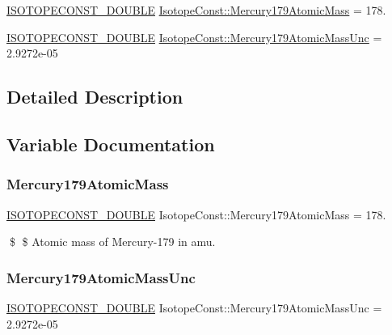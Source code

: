 \begin{DoxyCompactItemize}
\item 
\mbox{\hyperlink{group___isotope_const-_macros_ga8f45a7272ce02c0b4c65c44636ed719a}{I\+S\+O\+T\+O\+P\+E\+C\+O\+N\+S\+T\+\_\+\+D\+O\+U\+B\+LE}} \mbox{\hyperlink{group___isotope_const-_mercury-_hg179_gad746dcc5fec2ccf423e750c6542042ad}{Isotope\+Const\+::\+Mercury179\+Atomic\+Mass}} = 178.
\item 
\mbox{\hyperlink{group___isotope_const-_macros_ga8f45a7272ce02c0b4c65c44636ed719a}{I\+S\+O\+T\+O\+P\+E\+C\+O\+N\+S\+T\+\_\+\+D\+O\+U\+B\+LE}} \mbox{\hyperlink{group___isotope_const-_mercury-_hg179_ga9a365609a29168678fcc4df27f28bfd6}{Isotope\+Const\+::\+Mercury179\+Atomic\+Mass\+Unc}} = 2.\+9272e-\/05
\end{DoxyCompactItemize}


\subsection{Detailed Description}


\subsection{Variable Documentation}
\mbox{\label{group___isotope_const-_mercury-_hg179_gad746dcc5fec2ccf423e750c6542042ad}} 
\subsubsection{\texorpdfstring{Mercury179\+Atomic\+Mass}{Mercury179AtomicMass}}
{\footnotesize\ttfamily \mbox{\hyperlink{group___isotope_const-_macros_ga8f45a7272ce02c0b4c65c44636ed719a}{I\+S\+O\+T\+O\+P\+E\+C\+O\+N\+S\+T\+\_\+\+D\+O\+U\+B\+LE}} Isotope\+Const\+::\+Mercury179\+Atomic\+Mass = 178.}

\$ \$ Atomic mass of Mercury-\/179 in amu. \mbox{\label{group___isotope_const-_mercury-_hg179_ga9a365609a29168678fcc4df27f28bfd6}} 
\subsubsection{\texorpdfstring{Mercury179\+Atomic\+Mass\+Unc}{Mercury179AtomicMassUnc}}
{\footnotesize\ttfamily \mbox{\hyperlink{group___isotope_const-_macros_ga8f45a7272ce02c0b4c65c44636ed719a}{I\+S\+O\+T\+O\+P\+E\+C\+O\+N\+S\+T\+\_\+\+D\+O\+U\+B\+LE}} Isotope\+Const\+::\+Mercury179\+Atomic\+Mass\+Unc = 2.\+9272e-\/05}

